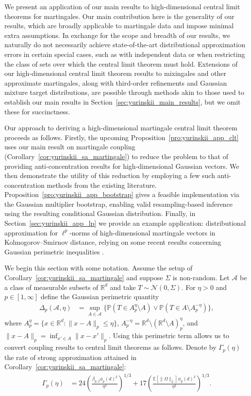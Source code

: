 \documentclass[11pt,lof]{puthesis}
\renewcommand{\P}{\ensuremath{\mathbb{P}}}
\newcommand{\R}{\ensuremath{\mathbb{R}}}
\newcommand{\E}{\ensuremath{\mathbb{E}}}
\newcommand{\cN}{\ensuremath{\mathcal{N}}}
\newcommand{\cA}{\ensuremath{\mathcal{A}}}
\theoremstyle{break}
\theoremstyle{proof}
\begin{document}
We present an application of our main results to
high-dimensional central limit theorems for martingales. Our main
contribution here is the generality of our results, which are broadly
applicable to martingale data and impose minimal extra assumptions. In exchange
for the scope and breadth of our results, we naturally do not necessarily
achieve state-of-the-art distributional approximation errors in certain special
cases, such as with independent data or when restricting the class of sets over
which the central limit theorem must hold. Extensions of our high-dimensional
central limit theorem results to mixingales and other approximate martingales,
along with third-order refinements and Gaussian mixture target distributions,
are possible through methods akin to those used to establish our main results
in Section~\ref{sec:yurinskii_main_results}, but we omit these for succinctness.

Our approach to deriving a high-dimensional martingale central limit theorem
proceeds as follows. Firstly, the upcoming
Proposition~\ref{pro:yurinskii_app_clt} uses our
main result on martingale coupling
(Corollary~\ref{cor:yurinskii_sa_martingale}) to
reduce the problem to that of providing anti-concentration results for
high-dimensional Gaussian vectors. We then demonstrate the utility of this
reduction by employing a few such anti-concentration methods from the existing
literature. Proposition~\ref{pro:yurinskii_app_bootstrap} gives a feasible
implementation via
the Gaussian multiplier bootstrap, enabling valid
resampling-based inference using
the resulting conditional Gaussian distribution. Finally, in
Section~\ref{sec:yurinskii_app_lp} we provide an example application:
distributional
approximation for $\ell^p$-norms of high-dimensional martingale vectors
in Kolmogorov--Smirnov distance, relying on some recent results
concerning Gaussian perimetric inequalities
\citep{nazarov2003maximal,kozbur2021dimension,
giessing2023anti,chernozhukov2017detailed}.

We begin this section with some notation. Assume the setup of
Corollary~\ref{cor:yurinskii_sa_martingale} and suppose $\Sigma$ is
non-random. Let $\cA$ be a class of measurable subsets of
$\R^d$ and take $T \sim \cN(0, \Sigma)$.
For $\eta>0$ and $p \in [1, \infty]$ define the Gaussian perimetric quantity
%
\begin{align*}
  \Delta_p(\cA, \eta)
  &=
  \sup_{A\in \cA}
  \big\{\P(T\in A_p^\eta\setminus A)
  \vee \P(T\in A \setminus A_p^{-\eta})\big\},
\end{align*}
%
where $A_p^\eta = \{x \in \R^d : \|x - A\|_p \leq \eta\}$,
$A_p^{-\eta} = \R^d \setminus (\R^d \setminus A)_p^\eta$,
and $\|x - A\|_p = \inf_{x' \in A} \|x - x'\|_p$.
Using this perimetric term allows us to convert coupling results
to central limit theorems as follows.
Denote by $\Gamma_p(\eta)$ the rate of strong approximation attained in
Corollary~\ref{cor:yurinskii_sa_martingale}:
%
\begin{align*}
  \Gamma_p(\eta)
  &=
  24 \left(
    \frac{\beta_{p,2} \phi_p(d)^2}{\eta^3}
  \right)^{1/3}
  + 17 \left(
    \frac{\E \left[ \|\Omega\|_2 \right] \phi_p(d)^2}{\eta^2}
  \right)^{1/3}.
\end{align*}
\end{document}
